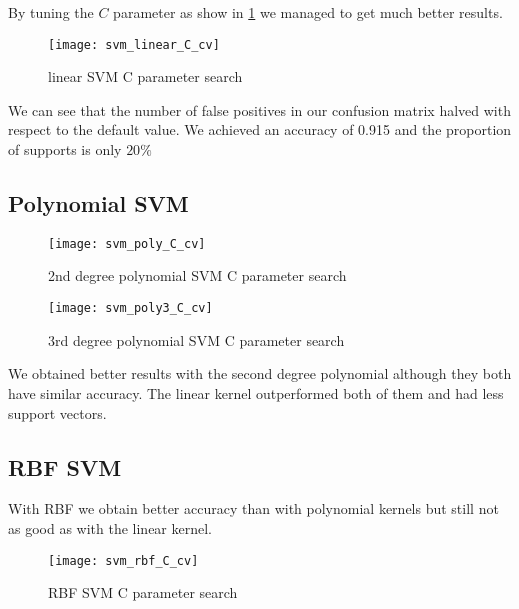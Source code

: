
By tuning the $C$ parameter as show in \cref{fig:svm_linear_C_cv} we managed to get much better results.

\begin{figure}[H]
    \centering
    \texttt{[image: svm\_linear\_C\_cv]}
    \caption{linear SVM C parameter search}%
    \label{fig:svm_linear_C_cv}
\end{figure}


We can see that the number of false positives in our confusion matrix halved with respect to the
default value. We achieved an accuracy of 0.915 and the proportion of supports is only $20\%$

\subsection{Polynomial SVM}


\begin{figure}[H]
    \centering
    \texttt{[image: svm\_poly\_C\_cv]}
    \caption{2nd degree polynomial SVM C parameter search}%
    \label{fig:svm_poly_C_cv}
\end{figure}


\begin{figure}[H]
    \centering
    \texttt{[image: svm\_poly3\_C\_cv]}
    \caption{3rd degree polynomial SVM C parameter search}%
    \label{fig:svm_poly3_C_cv}
\end{figure}

We obtained better results with the second degree polynomial although they both have similar accuracy. The linear
kernel outperformed both of them and had less support vectors.

\subsection{RBF SVM}

With RBF we obtain better accuracy than with polynomial kernels but still not as good as with the linear kernel.


\begin{figure}[H]
    \centering
    \texttt{[image: svm\_rbf\_C\_cv]}
    \caption{RBF SVM C parameter search}%
    \label{fig:svm_rbf_C_cv}
\end{figure}
